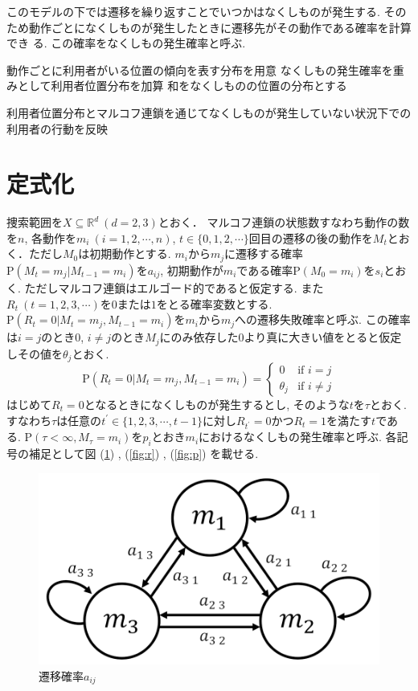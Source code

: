 このモデルの下では遷移を繰り返すことでいつかはなくしものが発生する.
そのため動作ごとになくしものが発生したときに遷移先がその動作である確率を計算でき
る.
この確率をなくしもの発生確率と呼ぶ.

動作ごとに利用者がいる位置の傾向を表す分布を用意
なくしもの発生確率を重みとして利用者位置分布を加算
和をなくしものの位置の分布とする

利用者位置分布とマルコフ連鎖を通じてなくしものが発生していない状況下での利用者の行動を反映

\section{定式化}
捜索範囲を$ X \subseteq \mathbb{R}^d \  (d=2,3)$とおく．
マルコフ連鎖の状態数すなわち動作の数を$ n $, 各動作を$ m_i\ (i=1,2,\cdots ,n)$, 
$ t \in \{0,1,2,\cdots\} $回目の遷移の後の動作を$ M_t $とおく．ただし$ M_0 $は初期動作とする. 
$ m_i $から$ m_j $に遷移する確率$ \mathrm{P}(M_t = m_j | M_{t-1} = m_i) $を$ a_{i j} $, 
初期動作が$ m_i $である確率$ \mathrm{P}(M_0 = m_i) $を$ s_i $とおく. 
ただしマルコフ連鎖はエルゴード的であると仮定する. \cite{funaki}
また$ R_t\ (t=1,2,3,\cdots) $を$ 0 $または$ 1 $をとる確率変数とする. 
$ \mathrm{P}(R_t = 0 | M_t = m_j , M_{t - 1} = m_i) $を$ m_i $から$ m_j $への遷移失敗確率と呼ぶ. 
この確率は$ i = j $のとき$ 0 $, $ i \ne j $のとき$ M_j $にのみ依存した$ 0 $より真に大きい値をとると仮定しその値を$ \theta_j $とおく. 
\begin{equation}
    \mathrm{P}(R_t = 0 | M_t = m_j , M_{t - 1} = m_i) =
    \begin{cases}
        0        & \text{if $i = j$}\\
        \theta_j & \text{if $i \ne j$}
    \end{cases}
\end{equation}
はじめて$ R_t = 0 $となるときになくしものが発生するとし, そのような$ t $を$ \tau $とおく. 
すなわち$ \tau $は任意の$ t^{\prime} \in \{1,2,3,\cdots,t-1\} $に対し$ R_{t^{\prime}} = 0 $かつ$ R_t = 1 $を満たす$ t $である. 
$ \mathrm{P}(\tau < \infty , M_{\tau} = m_i) $を$ p_i $とおき$ m_i $におけるなくしもの発生確率と呼ぶ. 
各記号の補足として図 (\ref{fig:a}) , (\ref{fig:r}) , (\ref{fig:p}) を載せる. 

\begin{figure}[H]
    \begin{center}
    \includegraphics[width=0.5\linewidth]{figs/tr_prob.png}
    \caption{遷移確率$a_{i j}$}
    \label{fig:a}
    \end{center}
\end{figure}

